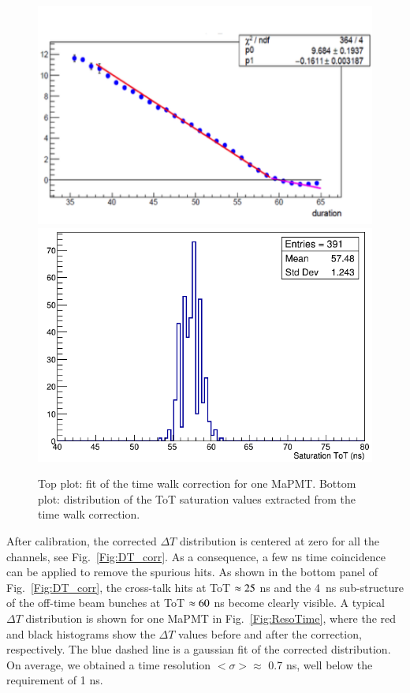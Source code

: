 \documentclass[5p,times,twocolumn]{elsarticle}
\def\MaPMT{MaPMT }
\def\dT{$\Delta T$ }
\begin{document}
\begin{figure}[t]
\begin{center}
\includegraphics[width=1.0\columnwidth]{time_walk_fit.png}
\includegraphics[width=1.0\columnwidth]{timewalk_D0.png}
\end{center}
\caption{Top plot: fit of the time walk correction for one MaPMT. Bottom plot: distribution of the ToT saturation values extracted from the time walk correction.}
\label{Fig:TimeWalk}
\end{figure}

After calibration, the corrected $\Delta T$ distribution is centered at zero for all the channels, see Fig.~\ref{Fig:DT_corr}. As a consequence, a few ns time coincidence can be applied to remove the spurious hits. As shown in the bottom panel of Fig.~\ref{Fig:DT_corr}, the cross-talk hits at ToT $\rm \approx 25$ ns and the 4~ns sub-structure of the off-time beam bunches at ToT $\rm \approx 60$ ns become clearly visible. A typical \dT distribution is shown for one \MaPMT in Fig.~\ref{Fig:ResoTime}, where the red and black histograms show the $\Delta T$ values before and after the correction, respectively. The blue dashed line is a gaussian fit of the corrected distribution.
On average, we obtained a time resolution $<\sigma> \approx$ 0.7 ns, well below the requirement of 1 ns.
\end{document}
